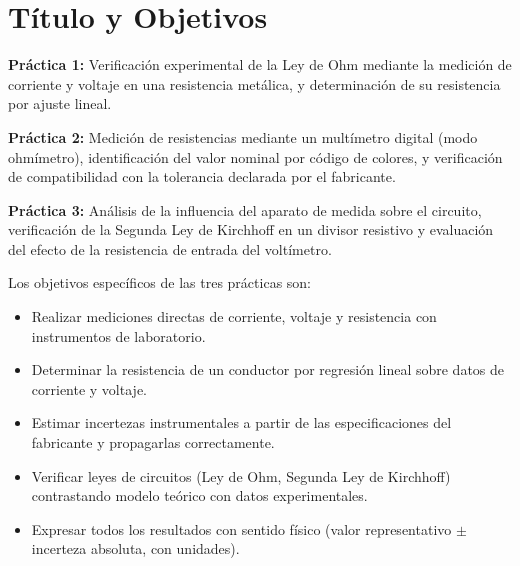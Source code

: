 \section{Título y Objetivos}
\label{sec:titulo/objetivos}

\noindent \textbf{Práctica 1:} Verificación experimental de la Ley de Ohm mediante la medición de corriente y voltaje en una resistencia metálica, y determinación de su resistencia por ajuste lineal.

\noindent \textbf{Práctica 2:} Medición de resistencias mediante un multímetro digital (modo ohmímetro), identificación del valor nominal por código de colores, y verificación de compatibilidad con la tolerancia declarada por el fabricante.

\noindent \textbf{Práctica 3:} Análisis de la influencia del aparato de medida sobre el circuito, verificación de la Segunda Ley de Kirchhoff en un divisor resistivo y evaluación del efecto de la resistencia de entrada del voltímetro.

\noindent Los objetivos específicos de las tres prácticas son:
\begin{itemize}
    \item Realizar mediciones directas de corriente, voltaje y resistencia con instrumentos de laboratorio.
    \item Determinar la resistencia de un conductor por regresión lineal sobre datos de corriente y voltaje.
    \item Estimar incertezas instrumentales a partir de las especificaciones del fabricante y propagarlas correctamente.
    \item Verificar leyes de circuitos (Ley de Ohm, Segunda Ley de Kirchhoff) contrastando modelo teórico con datos experimentales.
    \item Expresar todos los resultados con sentido físico (valor representativo $\pm$ incerteza absoluta, con unidades).
\end{itemize}
